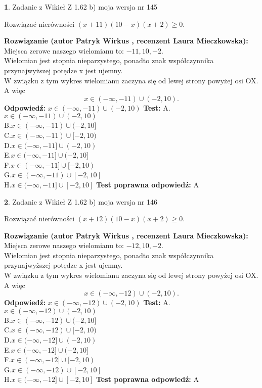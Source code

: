 \documentclass[12pt, a4paper]{article}
\theoremstyle{definition} %
\newtheorem{zad}{}
\newcommand{\zadStart}[1]{\begin{zad}#1\newline}
\newcommand{\zadStop}{\end{zad}}
\newcommand{\rozwStart}[2]{\noindent \textbf{Rozwiązanie (autor #1 , recenzent #2): }\newline}
\newcommand{\rozwStop}{\newline}
\newcommand{\odpStart}{\noindent \textbf{Odpowiedź:}\newline}
\newcommand{\odpStop}{\newline}
\newcommand{\testStart}{\noindent \textbf{Test:}\newline}
\newcommand{\testStop}{\newline}
\newcommand{\kluczStart}{\noindent \textbf{Test poprawna odpowiedź:}\newline}
\newcommand{\kluczStop}{\newline}
\begin{document}
\zadStart{Zadanie z Wikieł Z 1.62 b) moja wersja nr 145}

Rozwiązać nierówności $(x+11)(10-x)(x+2)\ge0$.
\zadStop
\rozwStart{Patryk Wirkus}{Laura Mieczkowska}
Miejsca zerowe naszego wielomianu to: $-11, 10, -2$.\\
Wielomian jest stopnia nieparzystego, ponadto znak współczynnika przy\linebreak najwyższej potędze x jest ujemny.\\ W związku z tym wykres wielomianu zaczyna się od lewej strony powyżej osi OX. A więc $$x \in (-\infty,-11) \cup (-2,10).$$
\rozwStop
\odpStart
$x \in (-\infty,-11) \cup (-2,10)$
\odpStop
\testStart
A.$x \in (-\infty,-11) \cup (-2,10)$\\
B.$x \in (-\infty,-11) \cup (-2,10]$\\
C.$x \in (-\infty,-11) \cup [-2,10)$\\
D.$x \in (-\infty,-11] \cup (-2,10)$\\
E.$x \in (-\infty,-11] \cup (-2,10]$\\
F.$x \in (-\infty,-11] \cup [-2,10)$\\
G.$x \in (-\infty,-11) \cup [-2,10]$\\
H.$x \in (-\infty,-11] \cup [-2,10]$
\testStop
\kluczStart
A
\kluczStop



\zadStart{Zadanie z Wikieł Z 1.62 b) moja wersja nr 146}

Rozwiązać nierówności $(x+12)(10-x)(x+2)\ge0$.
\zadStop
\rozwStart{Patryk Wirkus}{Laura Mieczkowska}
Miejsca zerowe naszego wielomianu to: $-12, 10, -2$.\\
Wielomian jest stopnia nieparzystego, ponadto znak współczynnika przy\linebreak najwyższej potędze x jest ujemny.\\ W związku z tym wykres wielomianu zaczyna się od lewej strony powyżej osi OX. A więc $$x \in (-\infty,-12) \cup (-2,10).$$
\rozwStop
\odpStart
$x \in (-\infty,-12) \cup (-2,10)$
\odpStop
\testStart
A.$x \in (-\infty,-12) \cup (-2,10)$\\
B.$x \in (-\infty,-12) \cup (-2,10]$\\
C.$x \in (-\infty,-12) \cup [-2,10)$\\
D.$x \in (-\infty,-12] \cup (-2,10)$\\
E.$x \in (-\infty,-12] \cup (-2,10]$\\
F.$x \in (-\infty,-12] \cup [-2,10)$\\
G.$x \in (-\infty,-12) \cup [-2,10]$\\
H.$x \in (-\infty,-12] \cup [-2,10]$
\testStop
\kluczStart
A
\kluczStop
\end{document}
